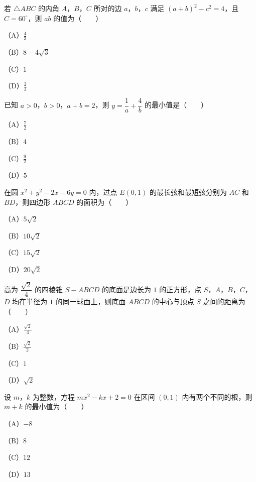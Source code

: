 \begin{question}
若 $\triangle ABC$ 的内角 $A$，$B$，$C$ 所对的边 $a$，$b$，$c$ 满足 $(a+b)^2-c^2=4$，且 $C=60^\circ$，则 $ab$ 的值为\mbox{（　　）}

（A）$\frac43$

（B）$8-4\sqrt3$

（C）$1$

（D）$\frac23$

\end{question}
\begin{question}
已知 $a>0$，$b>0$，$a+b=2$，则 $y=\dfrac1a+\dfrac4b$ 的最小值是\mbox{（　　）}

（A）$\frac72$

（B）$4$

（C）$\frac92$

（D）$5$

\end{question}
\begin{question}
在圆 $x^2+y^2-2x-6y=0$ 内，过点 $E(0,1)$ 的最长弦和最短弦分别为 $AC$ 和 $BD$，则四边形 $ABCD$ 的面积为\mbox{（　　）}

（A）$5\sqrt2$

（B）$10\sqrt2$

（C）$15\sqrt2$

（D）$20\sqrt2$

\end{question}
\begin{question}
高为 $\dfrac{\sqrt2}4$ 的四棱锥 $S-ABCD$ 的底面是边长为 $1$ 的正方形，点 $S$，$A$，$B$，$C$，$D$ 均在半径为 $1$ 的同一球面上，则底面 $ABCD$ 的中心与顶点 $S$ 之间的距离为\mbox{（　　）}

（A）$\frac{\sqrt2}4$

（B）$\frac{\sqrt2}2$

（C）$1$

（D）$\sqrt2$

\end{question}
\begin{question}
设 $m$，$k$ 为整数，方程 $mx^2-kx+2=0$ 在区间 $(0,1)$ 内有两个不同的根，则 $m+k$ 的最小值为\mbox{（　　）}

（A）$-8$

（B）$8$

（C）$12$

（D）$13$

\end{question}

